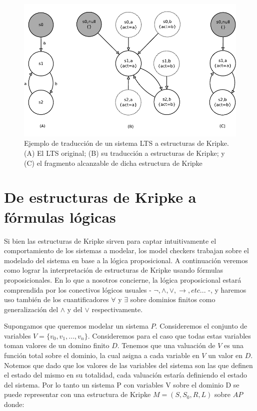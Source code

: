 \documentclass[titlepage, 12pt]{book}
\begin{document}
\begin{figure}[htp]
  \centering
    \includegraphics{Imagenes/ltsakripke.pdf}
  \caption{Ejemplo de traducci\'on de un sistema LTS a estructuras de Kripke. (A) El LTS original; (B) su traducci\'on a estructuras de Kripke; y (C) el fragmento alcanzable de dicha estructura de Kripke}
  \label{ltsakripke}
\end{figure}







\section{De estructuras de Kripke a f\'ormulas l\'ogicas}


Si bien las estructuras de Kripke sirven para captar intuitivamente el comportamiento de los sistemas a modelar, los model checkers trabajan sobre el modelado del sistema en base a la l\'ogica proposicional. A continuaci\'on veremos como lograr la interpretaci\'on de estructuras de Kripke usando f\'ormulas proposicionales. En lo que a nosotros concierne, la l\'ogica proposicional estar\'a comprendida por los conectivos l\'ogicos usuales - $\neg,\wedge,\vee,\rightarrow,etc...$ -, y haremos uso tambi\'en de los cuantificadores $\forall$ y $\exists$ sobre dominios finitos como generalizaci\'on del $\wedge$ y del $\vee$ respectivamente.

Supongamos que queremos modelar un sistema $P$. Consideremos el conjunto de variables $V = \lbrace v_0,v_1,...,v_n \rbrace$. Consideremos para el caso que todas estas variables toman valores de un domino finito $D$. Tenemos que una valuaci\'on de $V$ es una funci\'on total sobre el dominio, la cual asigna a cada variable en $V$ un valor en $D$. Notemos que dado que los valores de las variables del sistema son las que definen el estado del mismo en su totalidad, cada valuaci\'on estar\'ia definiendo el estado del sistema. Por lo tanto un sistema P con variables V sobre el dominio D se puede representar con una estructura de Kripke $M = (S,S_0,R,L)$ sobre $AP$ donde:
\end{document}
